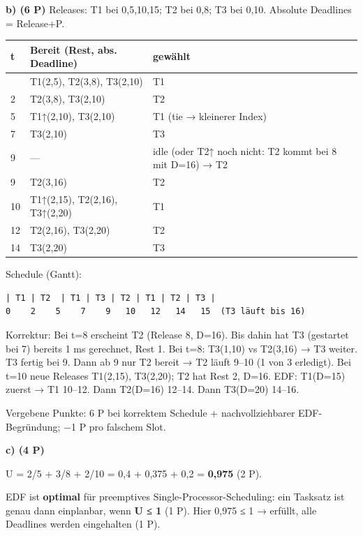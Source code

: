 \documentclass[11pt, a4paper]{article}
\begin{document}
\textbf{b) (6 P)} Releases: T1 bei 0,5,10,15; T2 bei 0,8; T3 bei 0,10. Absolute Deadlines = Release+P.



{\small
\begin{tabularx}{\linewidth}{XXX}
\hline
\rowcolor{tableheadbg}
{\color{white}\textbf{t}} & {\color{white}\textbf{Bereit (Rest, abs. Deadline)}} & {\color{white}\textbf{gewählt}} \\[2pt]
\hline
\endhead
\hline
\endfoot
0 & T1(2,5), T2(3,8), T3(2,10) & T1 \\
2 & T2(3,8), T3(2,10) & T2 \\
5 & T1↑(2,10), T3(2,10) & T1 (tie → kleinerer Index) \\
7 & T3(2,10) & T3 \\
9 & — & idle (oder T2↑ noch nicht: T2 kommt bei 8 mit D=16) → T2 \\
9 & T2(3,16) & T2 \\
10 & T1↑(2,15), T2(2,16), T3↑(2,20) & T1 \\
12 & T2(2,16), T3(2,20) & T2 \\
14 & T3(2,20) & T3 \\
\end{tabularx}
}


Schedule (Gantt):

\begin{lstlisting}
| T1 | T2  | T1 | T3 | T2 | T1 | T2 | T3 |
0    2    5    7    9   10   12   14   15  (T3 läuft bis 16)
\end{lstlisting}


Korrektur: Bei t=8 erscheint T2 (Release 8, D=16). Bis dahin hat T3 (gestartet bei 7) bereits 1 ms gerechnet, Rest 1. Bei t=8: T3(1,10) vs T2(3,16) → T3 weiter. T3 fertig bei 9. Dann ab 9 nur T2 bereit → T2 läuft 9–10 (1 von 3 erledigt). Bei t=10 neue Releases T1(2,15), T3(2,20); T2 hat Rest 2, D=16. EDF: T1(D=15) zuerst → T1 10–12. Dann T2(D=16) 12–14. Dann T3(D=20) 14–16.


Vergebene Punkte: 6 P bei korrektem Schedule + nachvollziehbarer EDF-Begründung; −1 P pro falschem Slot.


\textbf{c) (4 P)}

U = 2/5 + 3/8 + 2/10 = 0,4 + 0,375 + 0,2 = \textbf{0,975} (2 P).

EDF ist \textbf{optimal} für preemptives Single-Processor-Scheduling: ein Tasksatz ist genau dann einplanbar, wenn \textbf{U ≤ 1} (1 P). Hier 0,975 ≤ 1 → erfüllt, alle Deadlines werden eingehalten (1 P).
\end{document}
